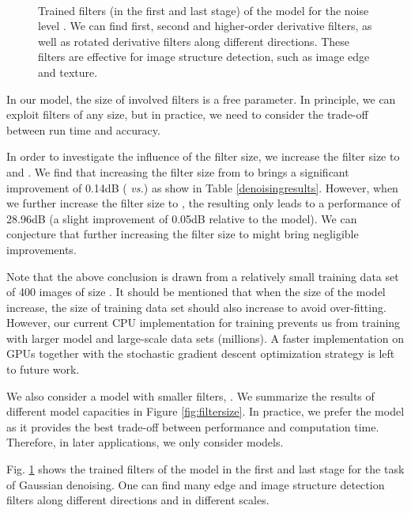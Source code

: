 \documentclass[10pt,journal,compsoc]{IEEEtran}
\newcommand{\vs}{\emph{vs.}}
\begin{document}
\begin{figure}[t!]
\centering
{}\\
\vspace*{-0.25cm}
\vspace*{-0.25cm}
\caption{Trained filters (in the first and last stage) of the  model for the noise level . 
We can find first, second and higher-order derivative filters, as well as rotated derivative filters along different directions. These filters 
are effective for image structure detection, such as image edge and texture.}\label{fig:filters}
\vspace*{-0.25cm}
\end{figure}
In our model, the size of involved filters is a free parameter. 
In principle, we can exploit filters of any size, but in practice, we 
need to consider the trade-off between run time and accuracy. 

In order to investigate the influence of the filter size, we increase the filter size to  and . We find 
that increasing the filter size from  to  brings a significant improvement of 0.14dB (
 \vs ) as show in Table \ref{denoisingresults}. 
However, when we further increase the filter size to , the resulting  only leads to a 
performance of 28.96dB (a slight improvement of 0.05dB relative to the  model). 
We can conjecture that further increasing the filter size to  
might bring negligible improvements. 

{Note that the above conclusion is drawn from a relatively small training 
data set of 400 images of size . It should be 
mentioned that when the size of the model increase, the size of training data set 
should also increase to avoid over-fitting. 
However, our current CPU implementation for training 
prevents us from training with larger model and large-scale data sets (millions). 
A faster implementation on GPUs together with the stochastic gradient descent 
optimization strategy is left to future work.}

We also consider a model with 
smaller filters, . We summarize the results of different model capacities in Figure \ref{fig:filtersize}. 
In practice, we prefer the  
model as it provides the best trade-off between performance and computation time. 
Therefore, in later applications, we only consider  models. 

Fig. \ref{fig:filters} shows the trained filters 
of the  model in the 
first and last stage for the task of Gaussian denoising. One can find many edge and image structure detection filters along 
different directions and in different scales. 
\end{document}
